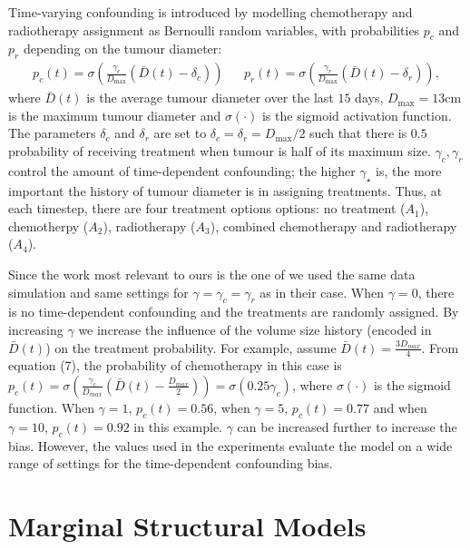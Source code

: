 \documentclass{article} %
\begin{document}
	Time-varying confounding is introduced by modelling  chemotherapy and radiotherapy assignment as Bernoulli random variables, with probabilities $p_c$ and $p_r$ depending on the tumour diameter: 
	\begin{align}
	p_c(t) = \sigma \left(\frac{\gamma_c}{D_{\max}} (\bar{D}(t) - \delta_c )  \right) && p_r(t) = \sigma \left(\frac{\gamma_r}{D_{\max}} (\bar{D}(t) - \delta_r ) \right),
	\end{align}
	where $\bar{D}(t)$ is the average tumour diameter over the last $15$ days, $D_{\max} = 13 \text{cm}$ is the maximum tumour diameter and $\sigma(\cdot)$ is the sigmoid activation function. The parameters $\delta_c$ and $\delta_r$ are set to $\delta_c = \delta_r = D_{\max}/2$ such that there is $0.5$ probability of receiving treatment when tumour is half of its maximum size. $\gamma_c, \gamma_r$ control the amount of time-dependent confounding; the higher $\gamma_{\star}$ is, the more important the history of tumour diameter is in assigning treatments. Thus, at each timestep, there are four treatment options options: no treatment ($A_1$),  chemotherpy ($A_2$),  radiotherapy ($A_3$), combined chemotherapy and radiotherapy ($A_4$). 

    Since the work most relevant to ours is the one of \cite{lim2018forecasting} we used the same data simulation and same settings for $\gamma = \gamma_c = \gamma_r$ as in their case. When $\gamma = 0$, there is no time-dependent confounding and the treatments are randomly assigned.  By increasing $\gamma$ we increase the influence of the volume size history (encoded in $\bar{D}(t)$) on the treatment probability. For example, assume $\bar{D}(t) = \frac{3D_{max}}{4}$. From equation (7), the probability of chemotherapy in this case is $p_c (t) = \sigma(\frac{\gamma_c}{D_{max}} (\bar{D}(t) - \frac{D_{max}}{2})) = \sigma(0.25\gamma_c)$, where $\sigma(\cdot)$ is the sigmoid function. When $\gamma = 1$, $p_c (t) = 0.56$, when $\gamma = 5$, $p_c (t) = 0.77$ and when $\gamma = 10$, $p_c (t) = 0.92$ in this example. $\gamma$ can be increased further to increase the bias. However, the values used in the experiments evaluate the model on a wide range of settings for the time-dependent confounding bias. 
    
    \newpage

	\section{Marginal Structural Models} \label{apx:marginal_structural_models}
	
\end{document}
